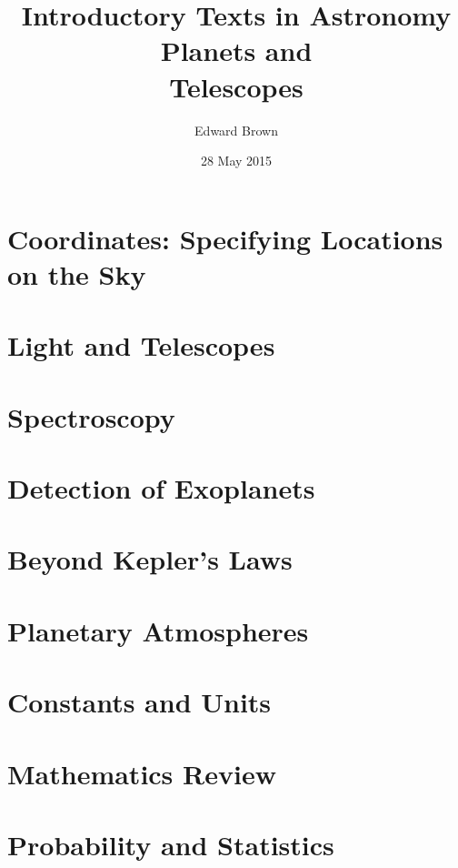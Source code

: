 \documentclass[symmetric]{astro-bookshelf}
\title[Planets and Telescopes]{{\Large Introductory Texts in Astronomy}\\Planets and\\Telescopes}
\author{Edward Brown}
\date{28 May 2015}
\begin{document}
\frontmatter
{}


\mainmatter
{}
\setcounter{page}{1}

\chapter{Coordinates: Specifying Locations on the Sky}\label{ch.coordinates}


\chapter{Light and Telescopes}\label{ch.light-telescopes}


\chapter{Spectroscopy}\label{ch.spectroscopy}


\chapter{Detection of Exoplanets}\label{ch.detection-exoplanets}


\chapter{Beyond Kepler's Laws}


\chapter{Planetary Atmospheres}


\appendix
\chapter{Constants and Units}


\chapter{Mathematics Review}\label{ch.math-review}


\chapter{Probability and Statistics}\label{ch.probability-statistics}


\backmatter


\end{document}
